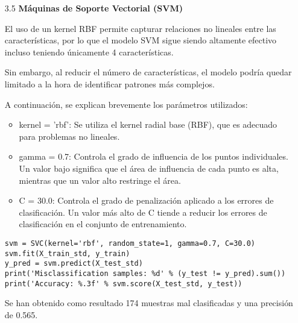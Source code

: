 \documentclass{article}
\begin{document}
\begin{itemize}

\item[3.5]  {\bf M\'aquinas de Soporte Vectorial (SVM)}

El uso de un kernel RBF permite capturar relaciones no lineales entre las caracter\'isticas, por lo que el modelo SVM sigue siendo altamente efectivo incluso teniendo \'unicamente 4 caracter\'isticas.

Sin embargo, al reducir el n\'umero de caracter\'isticas, el modelo podr\'ia quedar limitado a la hora de identificar patrones m\'as complejos.

A continuaci\'on, se explican brevemente los par\'ametros utilizados:

\begin{itemize}

\item
kernel = 'rbf': Se utiliza el kernel radial base (RBF), que es adecuado para problemas no lineales.

\item
gamma = 0.7: Controla el grado de influencia de los puntos individuales. Un valor bajo significa que el \'area de influencia de cada punto es alta, mientras que un valor alto restringe el \'area.

\item
C = 30.0: Controla el grado de penalizaci\'on aplicado a los errores de clasificaci\'on. Un valor m\'as alto de C tiende a reducir los errores de clasificaci\'on en el conjunto de entrenamiento.

\end{itemize}

\begin{tcolorbox}[width=14cm]
\begin{scriptsize}
\begin{verbatim}
svm = SVC(kernel='rbf', random_state=1, gamma=0.7, C=30.0)
svm.fit(X_train_std, y_train)
y_pred = svm.predict(X_test_std)
print('Misclassification samples: %d' % (y_test != y_pred).sum())
print('Accuracy: %.3f' % svm.score(X_test_std, y_test))
\end{verbatim}
\end{scriptsize}
\end{tcolorbox}

Se han obtenido como resultado 174 muestras mal clasificadas y una precisi\'on de 0.565.

\end{itemize}

\newpage
\end{document}
